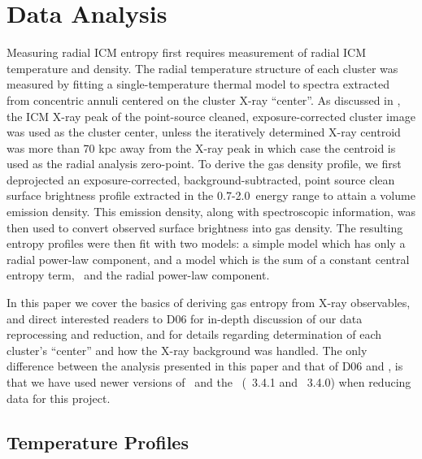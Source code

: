 \documentclass{emulateapj}
\begin{document}
\section{Data Analysis}
\label{sec:data}

Measuring radial ICM entropy first requires measurement of radial ICM
temperature and density. The radial temperature structure of each
cluster was measured by fitting a single-temperature thermal model to
spectra extracted from concentric annuli centered on the cluster X-ray
``center''. As discussed in \cite{xrayband}, the ICM X-ray peak of the
point-source cleaned, exposure-corrected cluster image was used as the
cluster center, unless the iteratively determined X-ray centroid was
more than 70 kpc away from the X-ray peak in which case the centroid
is used as the radial analysis zero-point. To derive the gas density
profile, we first deprojected an exposure-corrected,
background-subtracted, point source clean surface brightness profile
extracted in the 0.7-2.0\keV\ energy range to attain a volume emission
density. This emission density, along with spectroscopic information,
was then used to convert observed surface brightness into gas density.
The resulting entropy profiles were then fit with two models: a simple
model which has only a radial power-law component, and a model which
is the sum of a constant central entropy term, \kna\, and the radial
power-law component.

In this paper we cover the basics of deriving gas entropy from X-ray
observables, and direct interested readers to D06 for in-depth
discussion of our data reprocessing and reduction, and \cite{xrayband}
for details regarding determination of each cluster's ``center'' and
how the X-ray background was handled. The only difference between the
analysis presented in this paper and that of D06 and \cite{xrayband},
is that we have used newer versions of \ciao\ and the \caldb\ (\ciao\
3.4.1 and \caldb\ 3.4.0) when reducing data for this project.

\subsection{Temperature Profiles}
\label{sec:temppr}
\end{document}
